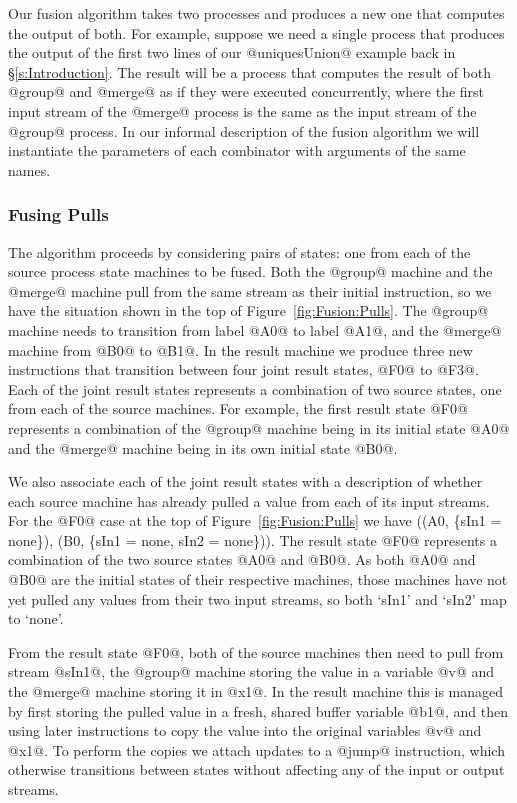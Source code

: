 Our fusion algorithm takes two processes and produces a new one that computes the output of both. For example, suppose we need a single process that produces the output of the first two lines of our @uniquesUnion@ example back in \S\ref{s:Introduction}. The result will be a process that computes the result of both @group@ and @merge@ as if they were executed concurrently, where the first input stream of the @merge@ process is the same as the input stream of the @group@ process. In our informal description of the fusion algorithm we will instantiate the parameters of each combinator with arguments of the same names.

\subsubsection{Fusing Pulls}
\label{s:Fusion:FusingPulls}

The algorithm proceeds by considering pairs of states: one from each of the source process state machines to be fused. Both the @group@ machine and the @merge@ machine pull from the same stream as their initial instruction, so we have the situation shown in the top of Figure~\ref{fig:Fusion:Pulls}. The @group@ machine needs to transition from label @A0@ to label @A1@, and the @merge@ machine from @B0@ to @B1@. In the result machine we produce three new instructions that transition between four joint result states, @F0@ to @F3@.
Each of the joint result states represents a combination of two source states, one from each of the source machines. For example, the first result state @F0@ represents a combination of the @group@ machine being in its initial state @A0@ and the @merge@ machine being in its own initial state @B0@. 

We also associate each of the joint result states with a description of whether each source machine has already pulled a value from each of its input streams. For the @F0@ case at the top of Figure~\ref{fig:Fusion:Pulls} we have ((A0, \{sIn1 = none\}), (B0, \{sIn1 = none, sIn2 = none\})). The result state @F0@ represents a combination of the two source states @A0@ and @B0@. As both @A0@ and @B0@ are the initial states of their respective machines, those machines have not yet pulled any values from their two input streams, so both `sIn1' and `sIn2' map to `none'.

From the result state @F0@, both of the source machines then need to pull from stream @sIn1@, the @group@ machine storing the value in a variable @v@ and the @merge@ machine storing it in @x1@. In the result machine this is managed by first storing the pulled value in a fresh, shared buffer variable @b1@, and then using later instructions to copy the value into the original variables @v@ and @x1@. To perform the copies we attach updates to a @jump@ instruction, which otherwise transitions between states without affecting any of the input or output streams.

